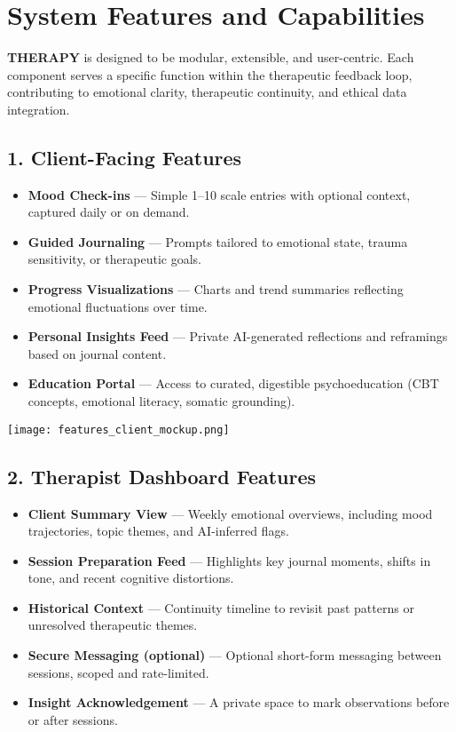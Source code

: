 \section{System Features and Capabilities}

\textbf{THERAPY} is designed to be modular, extensible, and user-centric. Each component serves a specific function within the therapeutic feedback loop, contributing to emotional clarity, therapeutic continuity, and ethical data integration.

\subsection*{1. Client-Facing Features}

\begin{itemize}
  \item \textbf{Mood Check-ins} — Simple 1–10 scale entries with optional context, captured daily or on demand.
  \item \textbf{Guided Journaling} — Prompts tailored to emotional state, trauma sensitivity, or therapeutic goals.
  \item \textbf{Progress Visualizations} — Charts and trend summaries reflecting emotional fluctuations over time.
  \item \textbf{Personal Insights Feed} — Private AI-generated reflections and reframings based on journal content.
  \item \textbf{Education Portal} — Access to curated, digestible psychoeducation (CBT concepts, emotional literacy, somatic grounding).
\end{itemize}

\vspace{1em}
\begin{center}
  \texttt{[image: features\_client\_mockup.png]}
\end{center}
\vspace{2em}

\subsection*{2. Therapist Dashboard Features}

\begin{itemize}
  \item \textbf{Client Summary View} — Weekly emotional overviews, including mood trajectories, topic themes, and AI-inferred flags.
  \item \textbf{Session Preparation Feed} — Highlights key journal moments, shifts in tone, and recent cognitive distortions.
  \item \textbf{Historical Context} — Continuity timeline to revisit past patterns or unresolved therapeutic themes.
  \item \textbf{Secure Messaging (optional)} — Optional short-form messaging between sessions, scoped and rate-limited.
  \item \textbf{Insight Acknowledgement} — A private space to mark observations before or after sessions.
\end{itemize}

